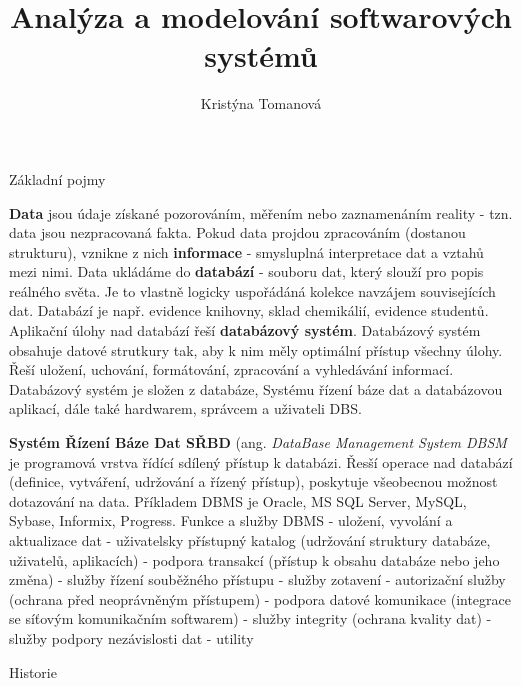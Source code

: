 \documentclass[11pt,a4paper]{book}   %
\author{Kristýna Tomanová}
\title{Analýza a modelování softwarových systémů}
\begin{document}
Základní pojmy

\textbf{Data} jsou údaje získané pozorováním, měřením nebo zaznamenáním reality - tzn. data jsou nezpracovaná fakta.
Pokud data projdou zpracováním (dostanou strukturu), vznikne z nich \textbf{informace} - smysluplná interpretace dat a vztahů mezi nimi.
Data ukládáme do \textbf{databází} - souboru dat, který slouží pro popis reálného světa. Je to vlastně logicky uspořádáná kolekce navzájem souvisejících dat. Databází je např. evidence knihovny, sklad chemikálií, evidence studentů. 
Aplikační úlohy nad databází řeší \textbf{databázový systém}. Databázový systém obsahuje datové strutkury tak, aby k nim měly optimální přístup všechny úlohy. Řeší uložení, uchování, formátování, zpracování a vyhledávání informací. Databázový systém je složen z databáze, Systému řízení báze dat a databázovou aplikací, dále také hardwarem, správcem a uživateli DBS.

\textbf{Systém Řízení Báze Dat SŘBD} (ang. \textit{DataBase Management System DBSM} je programová vrstva řídící sdílený přístup k databázi. Řesší operace nad databází (definice, vytváření, udržování a řízený přístup), poskytuje všeobecnou možnost dotazování na data. Příkladem DBMS je Oracle, MS SQL Server, MySQL, Sybase, Informix, Progress.
Funkce a služby DBMS
- uložení, vyvolání a aktualizace dat
- uživatelsky přístupný katalog (udržování struktury databáze, uživatelů, aplikacích)
- podpora transakcí (přístup k obsahu databáze nebo jeho změna)
- služby řízení souběžného přístupu
- služby zotavení
- autorizační služby (ochrana před neoprávněným přístupem)
- podpora datové komunikace (integrace se síťovým komunikačním softwarem)
- služby integrity (ochrana kvality dat)
- služby podpory nezávislosti dat
- utility


Historie
\end{document}
